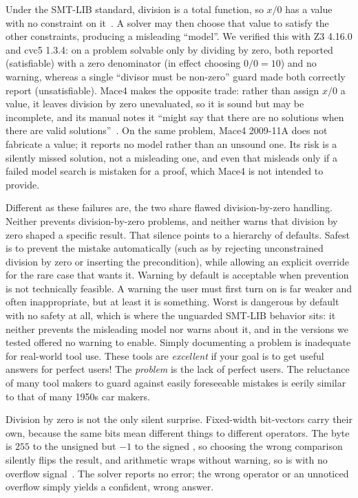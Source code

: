 Under the SMT-LIB standard, division is a total function, so $x / 0$ has a value with no constraint on it~\cite{BarFT-RR-25}. A solver may then choose that value to satisfy the other constraints, producing a misleading ``model''. We verified this with Z3 4.16.0 and cvc5 1.3.4: on a problem solvable only by dividing by zero, both reported  (satisfiable) with a zero denominator (in effect choosing $0 / 0 = 10$) and no warning, whereas a single ``divisor must be non-zero'' guard made both correctly report  (unsatisfiable). Mace4 makes the opposite trade: rather than assign $x / 0$ a value, it leaves division by zero unevaluated, so it is sound but may be incomplete, and its manual notes it ``might say that there are no solutions when there are valid solutions''~\cite{mccune2009mace4arithmetic}. On the same problem, Mace4 2009-11A does not fabricate a value; it reports no model rather than an unsound one. Its risk is a silently missed solution, not a misleading one, and even that misleads only if a failed model search is mistaken for a proof, which Mace4 is not intended to provide.

Different as these failures are, the two share flawed division-by-zero handling. Neither prevents division-by-zero problems, and neither warns that division by zero shaped a specific result. That silence points to a hierarchy of defaults. Safest is to prevent the mistake automatically (such as by rejecting unconstrained division by zero or inserting the precondition), while allowing an explicit override for the rare case that wants it. Warning by default is acceptable when prevention is not technically feasible. A warning the user must first turn on is far weaker and often inappropriate, but at least it is something. Worst is dangerous by default with no safety at all, which is where the unguarded SMT-LIB behavior sits: it neither prevents the misleading model nor warns about it, and in the versions we tested offered no warning to enable. Simply documenting a problem is inadequate for real-world tool use. These tools are \emph{excellent} if your goal is to get useful answers for perfect users! The \emph{problem} is the lack of perfect users. The reluctance of many tool makers to guard against easily foreseeable mistakes is eerily similar to that of many 1950s car makers.

Division by zero is not the only silent surprise. Fixed-width bit-vectors carry their own, because the same bits mean different things to different operators. The byte  is $255$ to the unsigned  but $-1$ to the signed , so choosing the wrong comparison silently flips the result, and arithmetic wraps without warning, so  is  with no overflow signal~\cite{BarFT-RR-25}. The solver reports no error; the wrong operator or an unnoticed overflow simply yields a confident, wrong answer.

